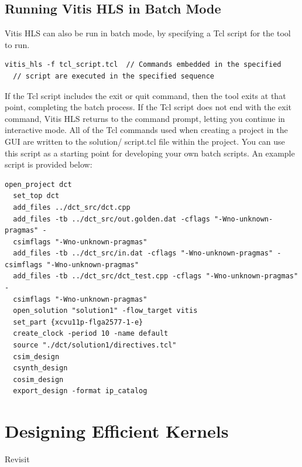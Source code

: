 \subsection{Running Vitis HLS in Batch Mode}
Vitis HLS can also be run in batch mode, by specifying a Tcl script for the tool to run.

\begin{lstlisting}[style=CStyle]
  vitis_hls -f tcl_script.tcl  // Commands embedded in the specified 
  // script are executed in the specified sequence
\end{lstlisting}

If the Tcl script includes the exit or quit command, then the tool exits at that point, completing the batch process. If the Tcl script does not end with the exit command, Vitis HLS returns to the command prompt, letting you continue in interactive mode. All of the Tcl commands used when creating a project in the GUI are written to the solution/ script.tcl file within the project. You can use this script as a starting point for developing your own batch scripts. An example script is provided below:

\begin{lstlisting}[style=CStyle] 
  open_project dct
  set_top dct
  add_files ../dct_src/dct.cpp
  add_files -tb ../dct_src/out.golden.dat -cflags "-Wno-unknown-pragmas" -
  csimflags "-Wno-unknown-pragmas"
  add_files -tb ../dct_src/in.dat -cflags "-Wno-unknown-pragmas" -csimflags "-Wno-unknown-pragmas"
  add_files -tb ../dct_src/dct_test.cpp -cflags "-Wno-unknown-pragmas" -
  csimflags "-Wno-unknown-pragmas"
  open_solution "solution1" -flow_target vitis
  set_part {xcvu11p-flga2577-1-e}
  create_clock -period 10 -name default
  source "./dct/solution1/directives.tcl"
  csim_design
  csynth_design
  cosim_design
  export_design -format ip_catalog
\end{lstlisting}










\section{Designing Efficient Kernels}


\begin{highlight}
  Revisit  
\end{highlight}




